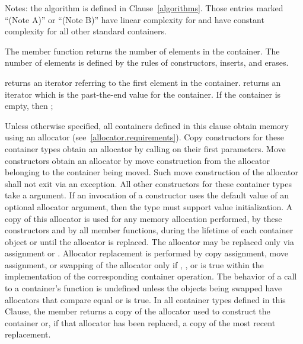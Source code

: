 Notes: the algorithm
is defined in Clause~\ref{algorithms}.
Those entries marked ``(Note A)'' or ``(Note B)''
have linear complexity for  and have constant complexity
for all other standard containers.

\pnum
The member function  returns the number of elements in the container.
The number of elements is defined by the rules of
constructors, inserts, and erases.

\pnum
{}
returns an iterator referring to the first element in the container.
returns an iterator which is the past-the-end value for the container.
If the container is empty, then
;

\pnum
Unless otherwise specified, all containers defined in this clause obtain memory
using an allocator (see~\ref{allocator.requirements}).
Copy constructors for these container types obtain an allocator by calling
on their first parameters.
Move constructors obtain an allocator by move construction from the allocator belonging to
the container being moved. Such move construction of the allocator shall not exit via an
exception.
All other constructors for these container types take a
 argument.
\enternote If an invocation of a constructor uses the default value of an optional
allocator argument, then the  type must support value initialization.
\exitnote
A copy of this allocator is used for any memory allocation performed, by these
constructors and by all member functions, during the lifetime of each container object
or until the allocator is replaced. The allocator may be replaced only via assignment or
. Allocator replacement is performed by
copy assignment, move assignment, or swapping of the allocator only if
,
,
or  is true
within the implementation of the corresponding container operation.
The behavior of a call to a container's  function is undefined unless the
objects being swapped have allocators that compare equal or
 is true.
In all container types defined in this Clause, the member 
returns a copy of the allocator used to construct the container or, if that allocator
has been replaced, a copy of the most recent replacement.

